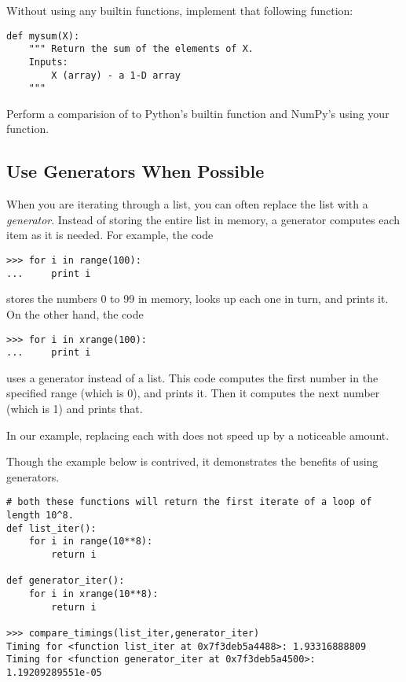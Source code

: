 \begin{problem} \label{prob:add}
Without using any builtin functions, implement that following function:
\begin{lstlisting}
def mysum(X):
    """ Return the sum of the elements of X.
    Inputs:
        X (array) - a 1-D array
    """
\end{lstlisting}
Perform a comparision of  to Python's builtin  function and
NumPy's  using your  function.
\end{problem}

\subsection*{Use Generators When Possible}
When you are iterating through a list, you can often replace the list with a \emph{generator}.
Instead of storing the entire list in memory, a generator computes each item as it is needed.
For example, the code
\begin{lstlisting}
>>> for i in range(100):
...     print i
\end{lstlisting}
stores the numbers 0 to 99 in memory, looks up each one in turn, and prints it.
On the other hand, the code
\begin{lstlisting}
>>> for i in xrange(100):
...     print i
\end{lstlisting}
uses a generator instead of a list.
This code computes the first number in the specified range (which is 0), and prints it.
Then it computes the next number (which is 1) and prints that.

In our example, replacing each  with  does not speed up  by a noticeable amount.

Though the example below is contrived, it demonstrates the benefits of using generators.
\begin{lstlisting}
# both these functions will return the first iterate of a loop of length 10^8.
def list_iter():
    for i in range(10**8):
        return i

def generator_iter():
    for i in xrange(10**8):
        return i

>>> compare_timings(list_iter,generator_iter)
Timing for <function list_iter at 0x7f3deb5a4488>: 1.93316888809
Timing for <function generator_iter at 0x7f3deb5a4500>: 1.19209289551e-05
\end{lstlisting}

